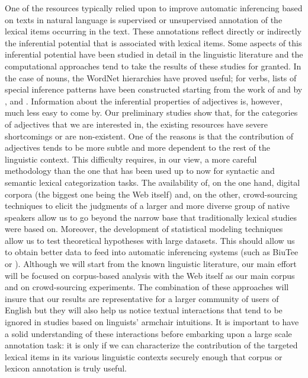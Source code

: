 \documentclass[10pt]{article}
\begin{document}
One of the resources  typically relied upon to improve automatic inferencing based on texts in natural language is supervised or unsupervised annotation of the lexical items occurring in the text. These annotations reflect directly or indirectly the inferential potential that is associated with lexical items. Some aspects of this inferential potential have been studied in detail in the linguistic literature and the computational approaches tend to take the results of these studies for granted. 
In the case of nouns, the WordNet hierarchies have proved useful; for verbs, lists of special inference patterns have been constructed starting from the work of \cite{kiparsky+kiparsky:1970} and \cite{karttunen:1971} by \cite{nairn+condoravdi+karttunen:2006}, \cite{sauri:2008phd,factbank:2009} and \cite{lotan:2012}. Information about the inferential properties of adjectives is, however, much less easy to come by. Our preliminary studies show that, for the categories of adjectives that we are interested in, the existing resources have severe shortcomings or are non-existent. One of the reasons is that the contribution of adjectives tends to be more subtle and more dependent to the rest of the linguistic context. This difficulty requires, in our view, a more careful methodology than the one that has been used up to now for syntactic and semantic lexical categorization tasks. The availability of, on the one hand, digital corpora (the biggest one being the Web itself) and, on the other, crowd-sourcing techniques to elicit the judgments of a larger and more diverse group of native speakers allow us to go beyond the narrow base that traditionally lexical studies were based on. Moreover, the development of statistical modeling techniques allow us to test theoretical hypotheses with large datasets. This should allow us to obtain better data to feed into automatic inferencing systems (such as BiuTee \cite{stern+dagan:2011} or \cite{clark2007role}). 
Although we will start from the known linguistic literature, our main effort will be focused on corpus-based analysis with the Web itself as our main corpus and on crowd-sourcing experiments. The combination of these approaches will insure that our results are representative for a larger community of users of English but they will also help us notice textual interactions that tend to be ignored in studies based on linguists' armchair intuitions.  It is important to have a solid understanding of these interactions before embarking upon a large scale annotation task: it is only if we can characterize the contribution of the targeted lexical items in its various linguistic contexts securely enough that corpus or lexicon annotation is truly useful. 
\end{document}
